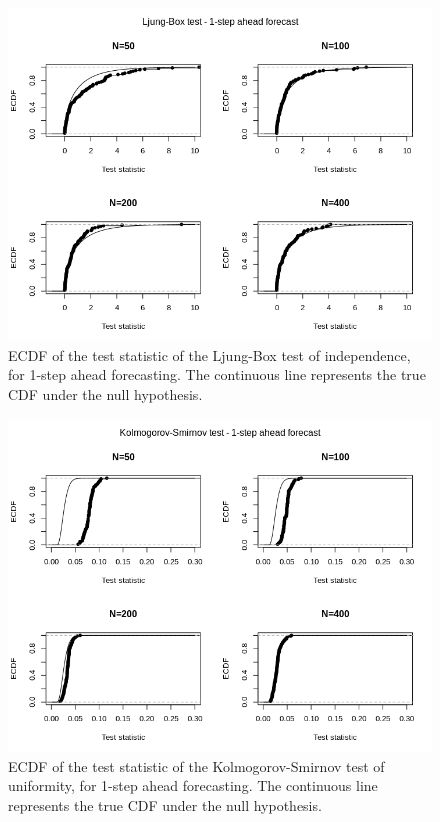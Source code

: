 \documentclass{article}
\begin{document}
\begin{figure}[ht]
\centering
\includegraphics[width=14cm]{LB-1.png}
\caption{ECDF of the test statistic of the Ljung-Box test of independence, for 1-step ahead forecasting. The continuous line represents the true CDF under the null hypothesis.}
\label{fig:LB-1}
\end{figure}

\begin{figure}[ht]
\centering
\includegraphics[width=14cm]{KS-1.png}
\caption{ECDF of the test statistic of the Kolmogorov-Smirnov test of uniformity, for 1-step ahead forecasting. The continuous line represents the true CDF under the null hypothesis.}
\label{fig:KS-1}
\end{figure}
\end{document}
